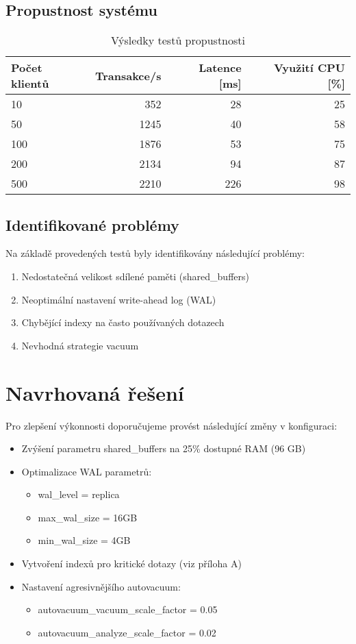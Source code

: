\documentclass[a4paper,12pt]{article}
\begin{document}
\subsection{Propustnost systému}
\begin{table}[h]
\centering
\begin{tabular}{@{}lrrr@{}}
\toprule
\textbf{Počet klientů} & \textbf{Transakce/s} & \textbf{Latence [ms]} & \textbf{Využití CPU [\%]} \\
\midrule
10 & 352 & 28 & 25 \\
50 & 1245 & 40 & 58 \\
100 & 1876 & 53 & 75 \\
200 & 2134 & 94 & 87 \\
500 & 2210 & 226 & 98 \\
\bottomrule
\end{tabular}
\caption{Výsledky testů propustnosti}
\end{table}

\subsection{Identifikované problémy}
Na základě provedených testů byly identifikovány následující problémy:
\begin{enumerate}
    \item Nedostatečná velikost sdílené paměti (shared\_buffers)
    \item Neoptimální nastavení write-ahead log (WAL)
    \item Chybějící indexy na často používaných dotazech
    \item Nevhodná strategie vacuum
\end{enumerate}

\section{Navrhovaná řešení}
Pro zlepšení výkonnosti doporučujeme provést následující změny v konfiguraci:

\begin{itemize}
    \item Zvýšení parametru shared\_buffers na 25\% dostupné RAM (96 GB)
    \item Optimalizace WAL parametrů:
    \begin{itemize}
        \item wal\_level = replica
        \item max\_wal\_size = 16GB
        \item min\_wal\_size = 4GB
    \end{itemize}
    \item Vytvoření indexů pro kritické dotazy (viz příloha A)
    \item Nastavení agresivnějšího autovacuum:
    \begin{itemize}
        \item autovacuum\_vacuum\_scale\_factor = 0.05
        \item autovacuum\_analyze\_scale\_factor = 0.02
    \end{itemize}
\end{itemize}
\end{document}
